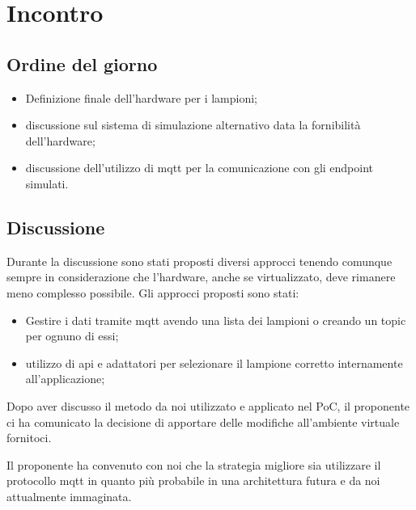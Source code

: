 \section{Incontro}

\subsection{Ordine del giorno}
\begin{itemize}
    \item Definizione finale dell'hardware per i lampioni;
    \item discussione sul sistema di simulazione alternativo data la fornibilità dell'hardware;
    \item discussione dell'utilizzo di mqtt per la comunicazione con gli endpoint simulati.
\end{itemize}

\subsection{Discussione}
Durante la discussione sono stati proposti diversi approcci tenendo comunque sempre in considerazione che l'hardware, anche se virtualizzato, deve rimanere meno complesso possibile.
Gli approcci proposti sono stati:
\begin{itemize}
    \item Gestire i dati tramite mqtt avendo una lista dei lampioni o creando un topic per ognuno di essi;
    \item utilizzo di api e adattatori per selezionare il lampione corretto internamente all'applicazione;
\end{itemize}
Dopo aver discusso il metodo da noi utilizzato e applicato nel PoC, il proponente ci ha comunicato la decisione di apportare delle modifiche all'ambiente virtuale fornitoci.

Il proponente ha convenuto con noi che la strategia migliore sia utilizzare il protocollo mqtt in quanto più probabile in una architettura futura e da noi attualmente immaginata.